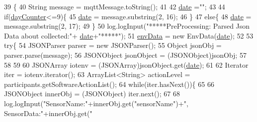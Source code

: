 \begin{DoxyCode}
39                                                 \{
40         String message = mqttMessage.toString();
41         
42          \mbox{\hyperlink{classcom_1_1github_1_1aites_1_1shlocalaites_1_1monitor_1_1_data_pre_processor_a296f8772bf957a63e75168b49b620fed}{date}} =\textcolor{stringliteral}{""}; 
43         
44         \textcolor{keywordflow}{if}(\mbox{\hyperlink{classcom_1_1github_1_1aites_1_1shlocalaites_1_1monitor_1_1_data_pre_processor_a0c0990b68908b9c96b2a832d33fd3ac4}{dayCounter}}<=9)\{
45             \mbox{\hyperlink{classcom_1_1github_1_1aites_1_1shlocalaites_1_1monitor_1_1_data_pre_processor_a296f8772bf957a63e75168b49b620fed}{date}} = message.substring(2, 16);
46         \}
47         \textcolor{keywordflow}{else}\{
48             \mbox{\hyperlink{classcom_1_1github_1_1aites_1_1shlocalaites_1_1monitor_1_1_data_pre_processor_a296f8772bf957a63e75168b49b620fed}{date}} = message.substring(2, 17);
49         \}
50         log.logInput(\textcolor{stringliteral}{"*****PreProcessing: Parsed Json Data about collected:"}+
      \mbox{\hyperlink{classcom_1_1github_1_1aites_1_1shlocalaites_1_1monitor_1_1_data_pre_processor_a296f8772bf957a63e75168b49b620fed}{date}}+\textcolor{stringliteral}{"*****"});
51         \mbox{\hyperlink{classcom_1_1github_1_1aites_1_1shlocalaites_1_1monitor_1_1_data_pre_processor_af8a0c4f55f04ec09d3c67c3a37de6bcc}{envData}} = \textcolor{keyword}{new} EnvData(\mbox{\hyperlink{classcom_1_1github_1_1aites_1_1shlocalaites_1_1monitor_1_1_data_pre_processor_a296f8772bf957a63e75168b49b620fed}{date}});
52         
53         \textcolor{keywordflow}{try}\{
54             JSONParser parser = \textcolor{keyword}{new} JSONParser();
55             Object jsonObj = parser.parse(message);
56             JSONObject jsonObject = (JSONObject)jsonObj; 
57             
58             
59             
60             JSONArray iotenv = (JSONArray)jsonObject.get(\mbox{\hyperlink{classcom_1_1github_1_1aites_1_1shlocalaites_1_1monitor_1_1_data_pre_processor_a296f8772bf957a63e75168b49b620fed}{date}});
61             
62             Iterator iter = iotenv.iterator();
63             ArrayList<String> actionLevel = participants.getSoftwareActionList();
64             \textcolor{keywordflow}{while}(iter.hasNext())\{
65                
66                 JSONObject innerObj = (JSONObject) iter.next();
67                 
68                 log.logInput(\textcolor{stringliteral}{"SensorName:"}+innerObj.get(\textcolor{stringliteral}{"sensorName"})+\textcolor{stringliteral}{", SensorData:"}+innerObj.get(\textcolor{stringliteral}{"
}
\end{DoxyCode}
